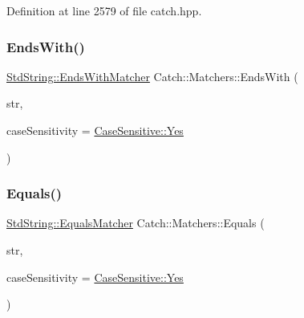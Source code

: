 Definition at line 2579 of file catch.\+hpp.

\mbox{\label{namespace_catch_1_1_matchers_ae5a45efb4538c57c43e04f3f9043ad6e}} 
\subsubsection{\texorpdfstring{Ends\+With()}{EndsWith()}}
{\footnotesize\ttfamily \mbox{\hyperlink{struct_catch_1_1_matchers_1_1_std_string_1_1_ends_with_matcher}{Std\+String\+::\+Ends\+With\+Matcher}} Catch\+::\+Matchers\+::\+Ends\+With (\begin{DoxyParamCaption}\item[{std\+::string const \&}]{str,  }\item[{\mbox{\hyperlink{struct_catch_1_1_case_sensitive_aad49d3aee2d97066642fffa919685c6a}{Case\+Sensitive\+::\+Choice}}}]{case\+Sensitivity = {\ttfamily \mbox{\hyperlink{struct_catch_1_1_case_sensitive_aad49d3aee2d97066642fffa919685c6aa7c5550b69ec3c502e6f609b67f9613c6}{Case\+Sensitive\+::\+Yes}}} }\end{DoxyParamCaption})}

\mbox{\label{namespace_catch_1_1_matchers_af8af7dfc338335ed4c788cb1b37fc59f}} 
\subsubsection{\texorpdfstring{Equals()}{Equals()}\hspace{0.1cm}{\footnotesize\ttfamily [1/2]}}
{\footnotesize\ttfamily \mbox{\hyperlink{struct_catch_1_1_matchers_1_1_std_string_1_1_equals_matcher}{Std\+String\+::\+Equals\+Matcher}} Catch\+::\+Matchers\+::\+Equals (\begin{DoxyParamCaption}\item[{std\+::string const \&}]{str,  }\item[{\mbox{\hyperlink{struct_catch_1_1_case_sensitive_aad49d3aee2d97066642fffa919685c6a}{Case\+Sensitive\+::\+Choice}}}]{case\+Sensitivity = {\ttfamily \mbox{\hyperlink{struct_catch_1_1_case_sensitive_aad49d3aee2d97066642fffa919685c6aa7c5550b69ec3c502e6f609b67f9613c6}{Case\+Sensitive\+::\+Yes}}} }\end{DoxyParamCaption})}

